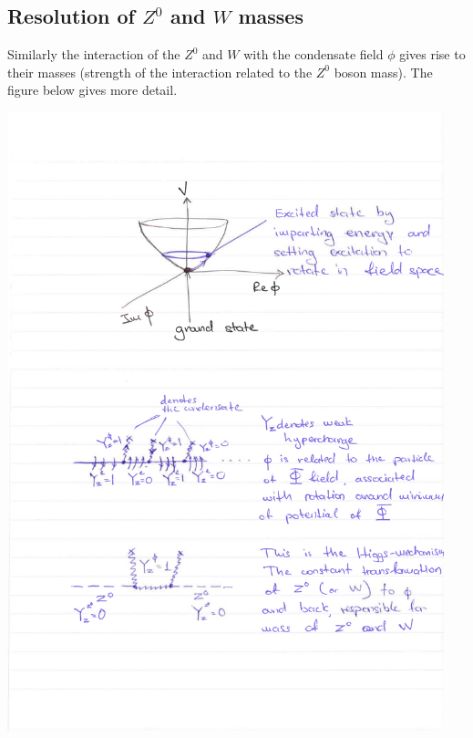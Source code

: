 \subsection{Resolution of $Z^0$ and $W$ masses}
Similarly the interaction of the $Z^0$ and $W$ with the condensate field $\phi$ gives rise to their masses (strength of the interaction related to the $Z^0$ boson mass). The figure below gives more detail.
\begin{center}
\includegraphics[width=0.95\textwidth]{fig/higgs/boson_mass.pdf}
\end{center}

